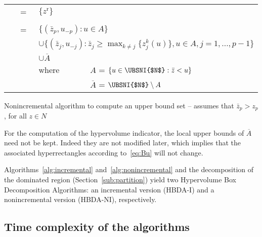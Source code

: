 \documentclass[a4paper,11pt]{article}
\newcommand{\bz}{\bar{z}}
\newcommand{\BM}{z^{\text{r}}}
\begin{document}
\begin{algorithm}
  \begin{tabular}{llll}
    \nl\UBSNI{$\emptyset$}~     & =~ & \multicolumn{2}{l}{$\{\BM\}$\;}\\
    &&&\\[-8pt]
    \nl\UBSNI{$N\cup \{\bz\}$}~ & =~ & \multicolumn{2}{l}{$\{(\bz_p, u_{-p}) : u \in A\}$\nllabel{alg:nonincremental:p}\;}\\
    \nl                         &    & \multicolumn{2}{l}{$\cup \{(\bz_j, u_{-j}) : \bz_j \geq \max_{k\neq j} \{z_j^{k}(u)\}, u \in A, j=1, \dots, p-1\}$\nllabel{alg:nonincremental:nr}\;}\\ 
    \nl                         &    & \multicolumn{2}{l}{$\cup \overline{A}$\;}\\ 
    \nl                         &    & where~ & $A$ = $\{u\in \text{\UBSNI{$N$}}: \bz<u\}$\nllabel{alg:nonincremental:A}\;\\
    \nl                         &    &        & $\overline{A}$ = $\text{\UBSNI{$N$}}\setminus A$\;
  \end{tabular}
  \caption{Nonincremental algorithm to compute an upper bound set 
  -- assumes that $\bz_p > z_p$, for all $z\in N$\label{alg:nonincremental}}
\end{algorithm}

For the computation of the hypervolume indicator,
the local upper bounds of $\overline{A}$ need not be kept.
Indeed they are not modified later, which implies that the associated hyperrectangles according to~\eqref{eq:Bu}
will not change.




\bigskip

Algorithms~\ref{alg:incremental} and~\ref{alg:nonincremental}
and the decomposition of the dominated region (Section~\ref{sub:partition})
yield two Hypervolume Box Decomposition Algorithms:
an incremental version (HBDA-I) and a nonincremental version
(HBDA-NI), respectively.

\subsection{Time complexity of the algorithms}\label{sub:time-complex}
\end{document}
